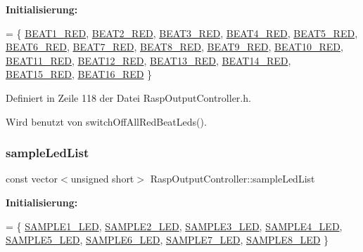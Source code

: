 {\bfseries Initialisierung\+:}
\begin{DoxyCode}
= \{
            \hyperlink{namespaceoutputs_ae1c055268c6bbfadcc272bc6028b1a59}{BEAT1\_RED}, \hyperlink{namespaceoutputs_a7b5646e7b81bc49443f10f2b852384bb}{BEAT2\_RED}, \hyperlink{namespaceoutputs_a0c48c063f394a0735f24036e932bff2b}{BEAT3\_RED}, 
      \hyperlink{namespaceoutputs_a73a38f1135a723ebb294500daa641aec}{BEAT4\_RED}, \hyperlink{namespaceoutputs_a992a202d7fce79a524fe71498efb3709}{BEAT5\_RED}, \hyperlink{namespaceoutputs_a44e21deb20acdd11aa47bd5c2358dd6c}{BEAT6\_RED}, \hyperlink{namespaceoutputs_a88730a5804ff8785e2fb07a1957a243c}{BEAT7\_RED}, 
      \hyperlink{namespaceoutputs_aeb7e7b9874ac290d2ff579a8b144fe13}{BEAT8\_RED}, \hyperlink{namespaceoutputs_a57a4d2c831b8b263bc763032afddaa03}{BEAT9\_RED},
            \hyperlink{namespaceoutputs_a3108e2ed7adaa0c15822673c1cf5341d}{BEAT10\_RED}, \hyperlink{namespaceoutputs_a3b55bd1a681764d7655dfee327930872}{BEAT11\_RED}, \hyperlink{namespaceoutputs_a3138968cd14e309f1e88228bd1259f3f}{BEAT12\_RED}, 
      \hyperlink{namespaceoutputs_a34ead0f387c2557f9d74d57186f1578f}{BEAT13\_RED}, \hyperlink{namespaceoutputs_ae72dd425b992846bc954f41227bdda1a}{BEAT14\_RED}, \hyperlink{namespaceoutputs_a6cdbcf8d70f85316af1ea2b96d9b72bd}{BEAT15\_RED}, \hyperlink{namespaceoutputs_a3dbc6b2fd920d581b752b72f86be3733}{BEAT16\_RED}
    \}
\end{DoxyCode}


Definiert in Zeile 118 der Datei Rasp\+Output\+Controller.\+h.



Wird benutzt von switch\+Off\+All\+Red\+Beat\+Leds().

\mbox{\label{class_rasp_output_controller_ad0ad19b081450eb1d9cd6548c14a23ea}} 
\subsubsection{\texorpdfstring{sample\+Led\+List}{sampleLedList}}
{\footnotesize\ttfamily const vector$<$unsigned short$>$ Rasp\+Output\+Controller\+::sample\+Led\+List\hspace{0.3cm}{\ttfamily [private]}}

{\bfseries Initialisierung\+:}
\begin{DoxyCode}
= \{
            \hyperlink{namespaceoutputs_a151156390f60151968f4092740d9d6b8}{SAMPLE1\_LED}, \hyperlink{namespaceoutputs_ae0776935fda36be3a645994d16591980}{SAMPLE2\_LED}, \hyperlink{namespaceoutputs_a8a0be2be0ae271cb8b57234a189b6689}{SAMPLE3\_LED}, 
      \hyperlink{namespaceoutputs_a6fbee7a72f91577a7e1f072d00ad8d9f}{SAMPLE4\_LED}, \hyperlink{namespaceoutputs_a87e2d51fbeb2ac9fd23fc5d937b1c7c2}{SAMPLE5\_LED}, \hyperlink{namespaceoutputs_a7bdee2eb9fc676ac7edb9582334be15a}{SAMPLE6\_LED}, 
      \hyperlink{namespaceoutputs_a3d438bc8ce91fb825bf2da7834ac639e}{SAMPLE7\_LED}, \hyperlink{namespaceoutputs_ac6e07c06d1d512716e6309db54648440}{SAMPLE8\_LED}
    \}
\end{DoxyCode}


